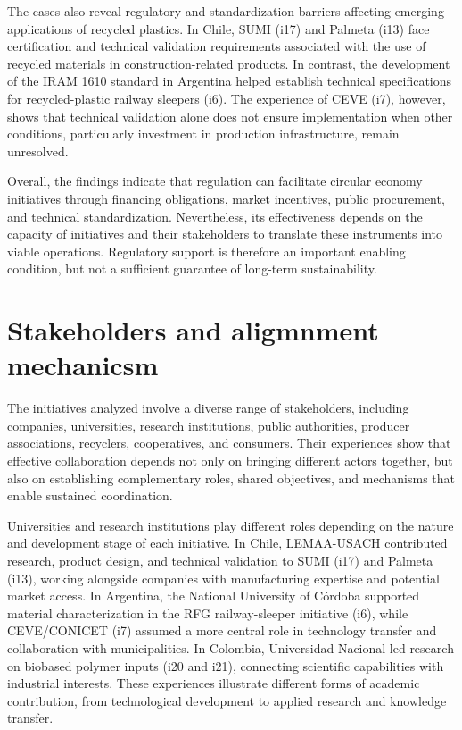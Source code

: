 \documentclass[
  12pt,
  oneside]{book}
\begin{document}
The cases also reveal regulatory and standardization barriers affecting
emerging applications of recycled plastics. In Chile, SUMI (i17) and
Palmeta (i13) face certification and technical validation requirements
associated with the use of recycled materials in construction-related
products. In contrast, the development of the IRAM 1610 standard in
Argentina helped establish technical specifications for recycled-plastic
railway sleepers (i6). The experience of CEVE (i7), however, shows that
technical validation alone does not ensure implementation when other
conditions, particularly investment in production infrastructure, remain
unresolved.

Overall, the findings indicate that regulation can facilitate circular
economy initiatives through financing obligations, market incentives,
public procurement, and technical standardization. Nevertheless, its
effectiveness depends on the capacity of initiatives and their
stakeholders to translate these instruments into viable operations.
Regulatory support is therefore an important enabling condition, but not
a sufficient guarantee of long-term sustainability.

\section{Stakeholders and aligmnment
mechanicsm}\label{stakeholders-and-aligmnment-mechanicsm}

The initiatives analyzed involve a diverse range of stakeholders,
including companies, universities, research institutions, public
authorities, producer associations, recyclers, cooperatives, and
consumers. Their experiences show that effective collaboration depends
not only on bringing different actors together, but also on establishing
complementary roles, shared objectives, and mechanisms that enable
sustained coordination.

Universities and research institutions play different roles depending on
the nature and development stage of each initiative. In Chile,
LEMAA-USACH contributed research, product design, and technical
validation to SUMI (i17) and Palmeta (i13), working alongside companies
with manufacturing expertise and potential market access. In Argentina,
the National University of Córdoba supported material characterization
in the RFG railway-sleeper initiative (i6), while CEVE/CONICET (i7)
assumed a more central role in technology transfer and collaboration
with municipalities. In Colombia, Universidad Nacional led research on
biobased polymer inputs (i20 and i21), connecting scientific
capabilities with industrial interests. These experiences illustrate
different forms of academic contribution, from technological development
to applied research and knowledge transfer.
\end{document}
